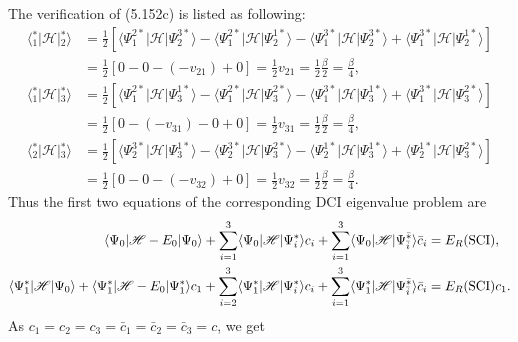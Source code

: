 \documentclass[a4paper]{book}
\newcounter{solution}[chapter]
\begin{document}
	\begin{solution}
	
	The verification of (5.152c) is listed as following:
	\begin{align*}
		\langle {}^*_1 | \mathscr{H} | {}^*_2 \rangle &= \frac{1}{2} \left[ \langle \Psi^{2*}_1 | \mathscr{H} | \Psi^{3*}_2 \rangle - \langle \Psi^{2*}_1 | \mathscr{H} | \Psi^{1*}_2 \rangle - \langle \Psi^{3*}_1 | \mathscr{H} | \Psi^{3*}_2 \rangle + \langle \Psi^{3*}_1 | \mathscr{H} | \Psi^{1*}_2 \rangle \right] \\
		&= \frac{1}{2} \left[ 0 - 0 - (- v_{21} ) + 0 \right] = \frac{1}{2} v_{21} = \frac{1}{2} \frac{ \beta }{2} = \frac{ \beta }{4} , \\
		\langle {}^*_1 | \mathscr{H} | {}^*_3 \rangle &= \frac{1}{2} \left[ \langle \Psi^{2*}_1 | \mathscr{H} | \Psi^{1*}_3 \rangle - \langle \Psi^{2*}_1 | \mathscr{H} | \Psi^{2*}_3 \rangle - \langle \Psi^{3*}_1 | \mathscr{H} | \Psi^{1*}_3 \rangle + \langle \Psi^{3*}_1 | \mathscr{H} | \Psi^{2*}_3 \rangle \right] \\
		&= \frac{1}{2} \left[ 0 - ( - v_{31} ) - 0 + 0 \right] = \frac{1}{2} v_{31} = \frac{1}{2} \frac{ \beta }{2} = \frac{ \beta }{4} , \\
		\langle {}^*_2 | \mathscr{H} | {}^*_3 \rangle &= \frac{1}{2} \left[ \langle \Psi^{3*}_2 | \mathscr{H} | \Psi^{1*}_3 \rangle - \langle \Psi^{3*}_2 | \mathscr{H} | \Psi^{2*}_3 \rangle - \langle \Psi^{1*}_2 | \mathscr{H} | \Psi^{1*}_3 \rangle + \langle \Psi^{1*}_2 | \mathscr{H} | \Psi^{2*}_3 \rangle \right] \\
		&= \frac{1}{2} \left[ 0 - 0 - ( - v_{32} ) + 0 \right] = \frac{1}{2} v_{32} = \frac{1}{2} \frac{ \beta }{2} = \frac{ \beta }{4} .
	\end{align*}
	Thus the first two equations of the corresponding DCI eigenvalue problem are
	\begin{align*}
		\langle \Psi_0 | \mathscr{H} - E_0 | \Psi_0 \rangle + \sum_{ i=1 }^3 \langle \Psi_0 | \mathscr{H} | \Psi^*_i \rangle c_i + \sum_{ i=1 }^3 \langle \Psi_0 | \mathscr{H} | \Psi^{\bar{*}}_{\bar{i}} \rangle \bar{c}_i &= E_R ( {\rm SCI} ) , \\
		\langle \Psi^*_1 | \mathscr{H} | \Psi_0 \rangle + \langle \Psi^*_1 | \mathscr{H} - E_0 | \Psi^*_1 \rangle c_1 +  \sum_{ i=2 }^3 \langle \Psi^*_1 | \mathscr{H} | \Psi^*_i \rangle c_i + \sum_{ i=1 }^3 \langle \Psi^*_1  | \mathscr{H} | \Psi^{\bar{*}}_{\bar{i}} \rangle \bar{c}_i &= E_R ( {\rm SCI} ) c_1 .
	\end{align*}
	As $c_1 = c_2 = c_3 = \bar{c}_1 = \bar{c}_2 = \bar{c}_3 = c$, we get	

\end{solution}
\end{document}
